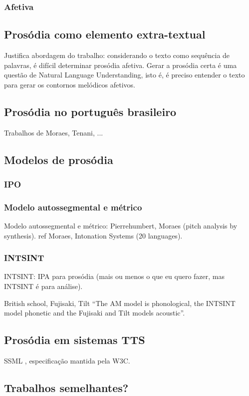 \subsubsection{Afetiva}
\subsection{Prosódia como elemento extra-textual}
Justifica abordagem do trabalho: considerando o texto como sequência de
palavras, é difícil determinar prosódia afetiva. Gerar a prosódia certa é uma
questão de Natural Language Understanding, isto é, é preciso entender o texto
para gerar os contornos melódicos afetivos.
\subsection{Prosódia no português brasileiro}
Trabalhos de Moraes, Tenani, ...
\subsection{Modelos de prosódia}
\subsubsection{IPO}
\subsubsection{Modelo autossegmental e métrico}
Modelo autossegmental e métrico: Pierrehumbert, Moraes (pitch analysis by synthesis).
ref Moraes, Intonation Systems (20 languages).
\subsubsection{INTSINT}
INTSINT: IPA para prosódia (mais ou menos o que eu quero fazer, mas INTSINT é
para análise).

British school, Fujisaki, Tilt
``The AM model is phonological, the INTSINT model phonetic and the Fujisaki and Tilt models acoustic''.
\subsection{Prosódia em sistemas TTS}
SSML \cite{SSML}, especificação mantida pela W3C.
\subsection{Trabalhos semelhantes?}
